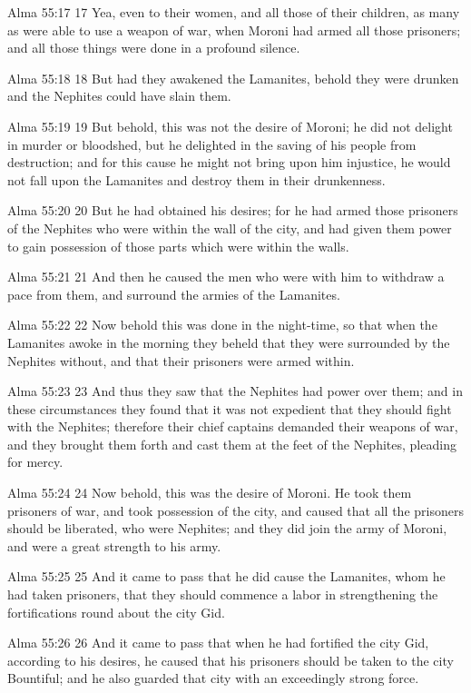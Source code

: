 Alma 55:17
 17 Yea, even to their women, and all those of their children, as
many as were able to use a weapon of war, when Moroni had armed
all those prisoners; and all those things were done in a profound
silence.

Alma 55:18
 18 But had they awakened the Lamanites, behold they were drunken
and the Nephites could have slain them.

Alma 55:19
 19 But behold, this was not the desire of Moroni; he did not
delight in murder or bloodshed, but he delighted in the saving of
his people from destruction; and for this cause he might not
bring upon him injustice, he would not fall upon the Lamanites
and destroy them in their drunkenness.

Alma 55:20
 20 But he had obtained his desires; for he had armed those
prisoners of the Nephites who were within the wall of the city,
and had given them power to gain possession of those parts which
were within the walls.

Alma 55:21
 21 And then he caused the men who were with him to withdraw a
pace from them, and surround the armies of the Lamanites.

Alma 55:22
 22 Now behold this was done in the night-time, so that when the
Lamanites awoke in the morning they beheld that they were
surrounded by the Nephites without, and that their prisoners were
armed within.

Alma 55:23
 23 And thus they saw that the Nephites had power over them; and
in these circumstances they found that it was not expedient that
they should fight with the Nephites; therefore their chief
captains demanded their weapons of war, and they brought them
forth and cast them at the feet of the Nephites, pleading for
mercy.

Alma 55:24
 24 Now behold, this was the desire of Moroni. He took them
prisoners of war, and took possession of the city, and caused
that all the prisoners should be liberated, who were Nephites;
and they did join the army of Moroni, and were a great strength
to his army.

Alma 55:25
 25 And it came to pass that he did cause the Lamanites, whom he
had taken prisoners, that they should commence a labor in
strengthening the fortifications round about the city Gid.

Alma 55:26
 26 And it came to pass that when he had fortified the city Gid,
according to his desires, he caused that his prisoners should be
taken to the city Bountiful; and he also guarded that city with
an exceedingly strong force.

